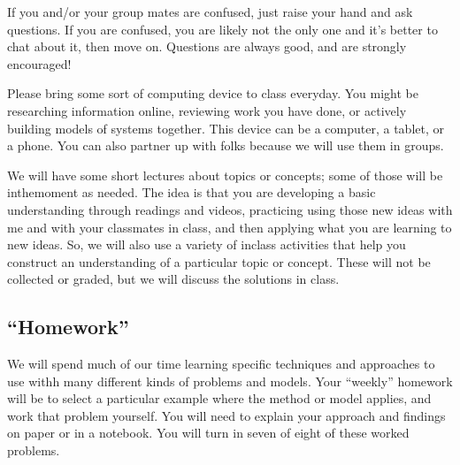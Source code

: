 \documentclass[letterpaper,10pt,english]{jupyterBook}
\begin{document}
\sphinxAtStartPar
If you and/or your group mates are confused, just raise your hand and ask questions. If you are confused, you are likely not the only one and it’s better to chat about it, then move on. Questions are always good, and are strongly encouraged! 

\sphinxAtStartPar
{} Please bring some sort of computing device to class everyday. You might be researching information online, reviewing work you have done, or actively building models of systems together. This device can be a computer, a tablet, or a phone. You can also partner up with folks because we will use them in groups. 

\sphinxAtStartPar
{} We will have some short lectures about topics or concepts; some of those will be in\sphinxhyphen{}the\sphinxhyphen{}moment as needed. The idea is that you are developing a basic understanding through readings and videos, practicing using those new ideas with me and with your classmates in class, and then applying what you are learning to new ideas. So, we will also use a variety of in\sphinxhyphen{}class activities that help you construct an understanding of a particular topic or concept. These will not be collected or graded, but we will discuss the solutions in class. 


\subsection{“Homework”}
\label{\detokenize{content/0_course/2_design:homework}}
\sphinxAtStartPar
{} We will spend much of our time learning specific techniques and approaches to use withh many different kinds of problems and models. Your “weekly” homework will be to select a particular example where the method or model applies, and work that problem yourself. You will need to explain your approach and findings on paper or in a notebook. You will turn in seven of eight of these worked problems. 
\end{document}
